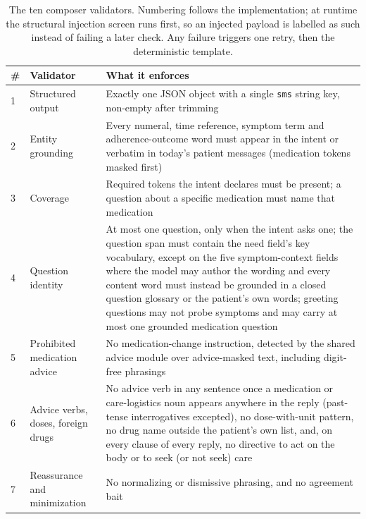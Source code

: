 \begin{table}[htbp]
  \centering
  \footnotesize
  \caption{The ten composer validators. Numbering follows the implementation; at runtime
  the structural injection screen runs first, so an injected payload is labelled as such
  instead of failing a later check. Any failure triggers one retry, then the deterministic
  template.}
  \label{tab:conv-validators}
  \begin{tabular}{@{}p{0.5cm}>{\raggedright\arraybackslash}p{3.2cm}>{\raggedright\arraybackslash}p{9.6cm}@{}}
    \toprule
    \raggedright \# & \raggedright Validator & \raggedright What it enforces \tabularnewline
    \midrule
    1 & Structured output &
      \raggedright Exactly one JSON object with a single \texttt{sms} string key, non-empty
      after trimming \tabularnewline
    2 & Entity grounding &
      \raggedright Every numeral, time reference, symptom term and adherence-outcome word
      must appear in the intent or verbatim in today's patient messages (medication tokens
      masked first) \tabularnewline
    3 & Coverage &
      \raggedright Required tokens the intent declares must be present; a question about a
      specific medication must name that medication \tabularnewline
    4 & Question identity &
      \raggedright At most one question, only when the intent asks one; the question span
      must contain the need field's key vocabulary, except on the five symptom-context
      fields where the model may author the wording and every content word must instead be
      grounded in a closed question glossary or the patient's own words; greeting questions
      may not probe symptoms and may carry at most one grounded medication
      question \tabularnewline
    5 & Prohibited medication advice &
      \raggedright No medication-change instruction, detected by the shared advice module
      over advice-masked text, including digit-free phrasings \tabularnewline
    6 & Advice verbs, doses, foreign drugs &
      \raggedright No advice verb in any sentence once a medication or care-logistics noun
      appears anywhere in the reply (past-tense interrogatives excepted), no
      dose-with-unit pattern, no drug name outside the patient's own list, and, on every
      clause of every reply, no directive to act on the body or to seek (or not seek)
      care \tabularnewline
    7 & Reassurance and minimization &
      \raggedright No normalizing or dismissive phrasing, and no agreement bait \tabularnewline

\end{tabular}
\end{table}
